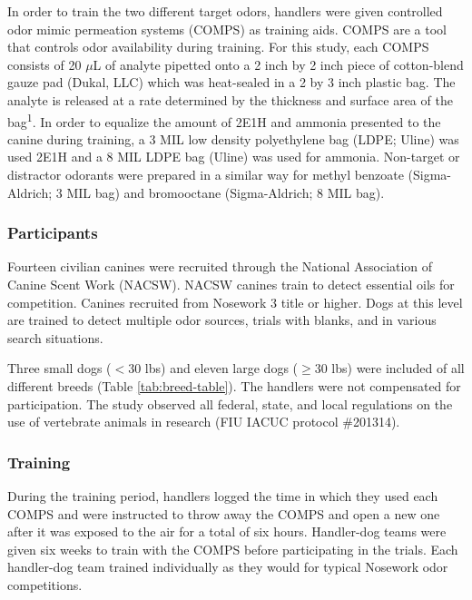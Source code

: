 \documentclass[
]{article}
\begin{document}
In order to train the two different target odors, handlers were given controlled odor mimic permeation systems (COMPS) as training aids. COMPS are a tool that controls odor availability during training. For this study, each COMPS consists of 20 \(\mu\)L of analyte pipetted onto a 2 inch by 2 inch piece of cotton-blend gauze pad (Dukal, LLC) which was heat-sealed in a 2 by 3 inch plastic bag. The analyte is released at a rate determined by the thickness and surface area of the bag\textsuperscript{1}. In order to equalize the amount of 2E1H and ammonia presented to the canine during training, a 3 MIL low density polyethylene bag (LDPE; Uline) was used 2E1H and a 8 MIL LDPE bag (Uline) was used for ammonia. Non-target or distractor odorants were prepared in a similar way for methyl benzoate (Sigma-Aldrich; 3 MIL bag) and bromooctane (Sigma-Aldrich; 8 MIL bag).

\hypertarget{participants}{%
\subsubsection{Participants}\label{participants}}

Fourteen civilian canines were recruited through the National Association of Canine Scent Work (NACSW)\texttrademark. NACSW canines train to detect essential oils for competition. Canines recruited from Nosework 3 title or higher. Dogs at this level are trained to detect multiple odor sources, trials with blanks, and in various search situations.

Three small dogs (\(< 30\) lbs) and eleven large dogs (\(\geq 30\) lbs) were included of all different breeds (Table \ref{tab:breed-table}). The handlers were not compensated for participation. The study observed all federal, state, and local regulations on the use of vertebrate animals in research (FIU IACUC protocol \#201314).

\hypertarget{training}{%
\subsubsection{Training}\label{training}}

During the training period, handlers logged the time in which they used each COMPS and were instructed to throw away the COMPS and open a new one after it was exposed to the air for a total of six hours. Handler-dog teams were given six weeks to train with the COMPS before participating in the trials. Each handler-dog team trained individually as they would for typical Nosework odor competitions.
\end{document}
